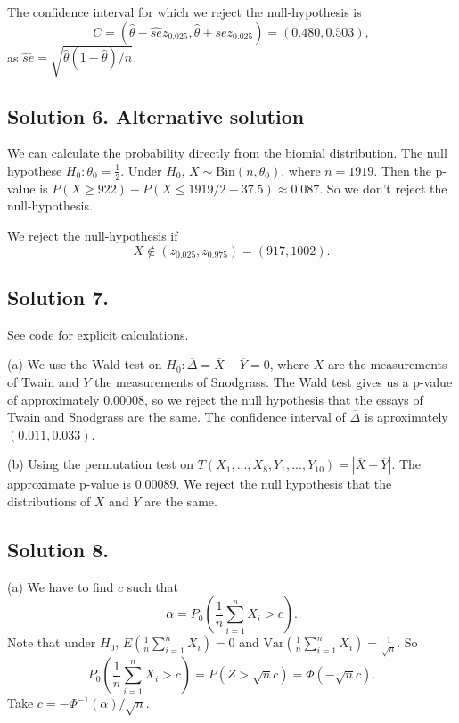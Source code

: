 The confidence interval for which we reject the null-hypothesis is
$$
C = (\hat{\theta} - \hat{se} z_{0.025}, \hat{\theta} + \hat{se} z_{0.025})
    = (0.480, 0.503),
$$
as $\hat{se} = \sqrt{\hat{\theta}(1 - \hat{\theta})/n}$.

\subsection*{Solution 6. Alternative solution}

We can calculate the probability directly from the biomial distribution.
The null hypothese $H_0: \theta_0 = \frac{1}{2}$.
Under $H_0$, $X \sim \mathrm{Bin}(n, \theta_0)$, where $n = 1919$.
Then the p-value is $P(X \geq 922) + P(X \leq 1919/2 - 37.5) \approx 0.087$.
So we don't reject the null-hypothesis.

We reject the null-hypothesis if
$$
    X \notin (z_{0.025}, z_{0.975}) = (917, 1002).
$$


\subsection*{Solution 7.}

See code for explicit calculations.

(a) We use the Wald test on $H_0: \overline{\Delta} = \overline{X} - \overline{Y} = 0$, where $X$ are the measurements of Twain and $Y$ the measurements of Snodgrass.
The Wald test gives us a p-value of approximately $0.00008$, so we reject the null hypothesis that the essays of Twain and Snodgrass are the same.
The confidence interval of $\overline{\Delta}$ is aproximately $(0.011, 0.033)$.

(b) Using the permutation test on $T(X_1, ..., X_8, Y_1, ..., Y_{10}) = |\overline{X} - \overline{Y}|$.
The approximate p-value is $0.00089$.
We reject the null hypothesis that the distributions of $X$ and $Y$ are the same.


\subsection*{Solution 8.}

(a) We have to find $c$ such that
$$
\alpha = P_0\left(\frac{1}{n}\sum_{i = 1}^n X_i > c\right).
$$
Note that under $H_0$, $E(\frac{1}{n}\sum_{i = 1}^n X_i) = 0$ and $\mathrm{Var}(\frac{1}{n}\sum_{i = 1}^n X_i) = \frac{1}{\sqrt{n}}$.
So
$$
P_0\left(\frac{1}{n} \sum_{i = 1}^n X_i > c\right) = P(Z > \sqrt{n}c) = \Phi(-\sqrt{n}c).
$$
Take $c = -\Phi^{-1}(\alpha)/\sqrt{n}$.

